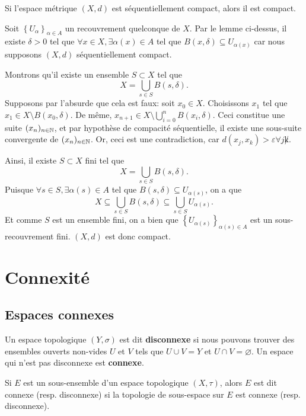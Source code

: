 \documentclass[french]{article}
\begin{document}
\begin{propo}
  Si l'espace métrique $(X, d)$ est séquentiellement compact, alors il est compact.

  \tcblower
  \begin{preuve}
    Soit $\left\{ U_\alpha \right\}_{\alpha \in A}$ un recouvrement quelconque de $X$. Par le lemme ci-dessus, il existe $\delta > 0$ tel que $\forall x \in X, \exists \alpha(x) \in A$ tel que $B(x, \delta) \subseteq U_{\alpha(x)}$ car nous supposons $(X, d)$ séquentiellement compact.
    \par Montrons qu'il existe un ensemble $S \subset X$ tel que
    $$X = \bigcup_{s \in S} B(s, \delta).$$
    Supposons par l'absurde que cela est faux: soit $x_0\in X$. Choisissons $x_1$ tel que $x_1 \in X \setminus B(x_0, \delta)$. De même, $x_{n+1} \in X \setminus \bigcup\limits_{i=0}^n B(x_i, \delta)$. Ceci constitue une suite $(x_n)_{n \in \mathbb{N}}$, et par hypothèse de compacité séquentielle, il existe une sous-suite convergente de $(x_n)_{n \in \mathbb{N}}$. Or, ceci est une contradiction, car $d(x_j, x_k) > \varepsilon \forall j \not k$.
    \par Ainsi, il existe $S \subset X$ fini tel que
    $$X = \bigcup_{s \in S} B(s, \delta).$$
    Puisque $\forall s \in S, \exists \alpha(s) \in A$ tel que $B(s, \delta) \subseteq U_{\alpha(s)}$, on a que
    $$X \subseteq \bigcup_{s \in S}B(s, \delta) \subseteq \bigcup_{s \in S} U_{\alpha(s)}.$$
    Et comme $S$ est un ensemble fini, on a bien que $\left\{ U_{\alpha(s)} \right\}_{\alpha(s) \in A}$ est un sous-recouvrement fini. $(X, d)$ est donc compact.
  \end{preuve}
\end{propo}

\section{Connexité}
\subsection{Espaces connexes}

\begin{definition}
  Un espace topologique $(Y, \sigma)$ est dit \textbf{disconnexe} si nous pouvons trouver des ensembles ouverts non-vides $U$ et $V$ tels que $U \cup V = Y$ et $U \cap V = \varnothing$. Un espace qui n'est pas disconnexe est \textbf{connexe}.
\end{definition}

\begin{definition}
  Si $E$ est un sous-ensemble d'un espace topologique $(X, \tau)$, alors $E$ est dit connexe (resp. disconnexe) si la topologie de sous-espace sur $E$ est connexe (resp. disconnexe).
\end{definition}
\end{document}
